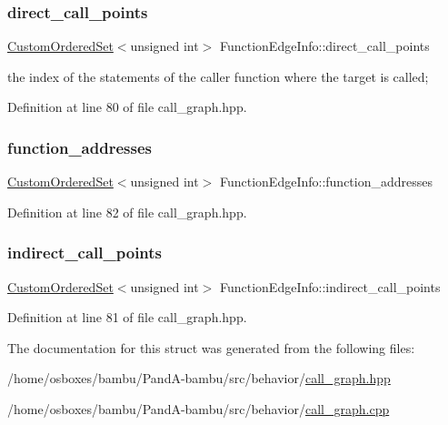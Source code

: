 \subsubsection{\texorpdfstring{direct\+\_\+call\+\_\+points}{direct\_call\_points}}
{\footnotesize\ttfamily \hyperlink{classCustomOrderedSet}{Custom\+Ordered\+Set}$<$unsigned int$>$ Function\+Edge\+Info\+::direct\+\_\+call\+\_\+points}



the index of the statements of the caller function where the target is called; 



Definition at line 80 of file call\+\_\+graph.\+hpp.

\mbox{\label{structFunctionEdgeInfo_af19373bf4bf8c9c68476b9d5c1a48fd0}} 
\subsubsection{\texorpdfstring{function\+\_\+addresses}{function\_addresses}}
{\footnotesize\ttfamily \hyperlink{classCustomOrderedSet}{Custom\+Ordered\+Set}$<$unsigned int$>$ Function\+Edge\+Info\+::function\+\_\+addresses}



Definition at line 82 of file call\+\_\+graph.\+hpp.

\mbox{\label{structFunctionEdgeInfo_a83be633ec281bd32d7ff3552fd40e758}} 
\subsubsection{\texorpdfstring{indirect\+\_\+call\+\_\+points}{indirect\_call\_points}}
{\footnotesize\ttfamily \hyperlink{classCustomOrderedSet}{Custom\+Ordered\+Set}$<$unsigned int$>$ Function\+Edge\+Info\+::indirect\+\_\+call\+\_\+points}



Definition at line 81 of file call\+\_\+graph.\+hpp.



The documentation for this struct was generated from the following files\+:\begin{DoxyCompactItemize}
\item 
/home/osboxes/bambu/\+Pand\+A-\/bambu/src/behavior/\hyperlink{call__graph_8hpp}{call\+\_\+graph.\+hpp}\item 
/home/osboxes/bambu/\+Pand\+A-\/bambu/src/behavior/\hyperlink{call__graph_8cpp}{call\+\_\+graph.\+cpp}\end{DoxyCompactItemize}
